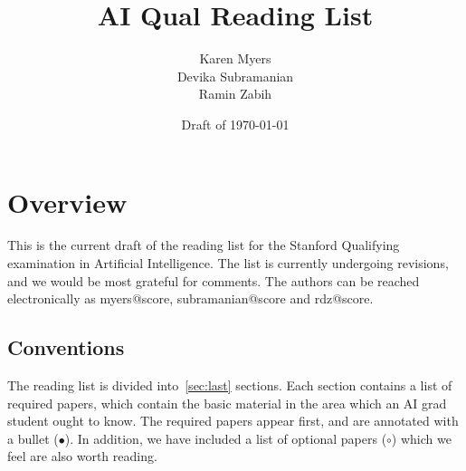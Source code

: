\title{AI Qual Reading List} 
\author{Karen Myers\\
        Devika Subramanian\\
        Ramin Zabih} %

\date{Draft of \today}



\maketitle


\section*{Overview}

This is the current draft of the reading list for the Stanford
Qualifying examination in Artificial Intelligence.  The list is
currently undergoing revisions, and we would be most grateful for
comments.  The authors can be reached electronically as {\sc
myers@score}, {\sc subramanian@score} and {\sc rdz@score}.

\subsection*{Conventions}

The reading list is divided into~\ref{sec:last} sections.  Each
section contains a list of required papers, which contain the basic
material in the area which an AI grad student ought to know.  The
required papers appear first, and are annotated with a bullet
($\bullet$).  In addition, we have included a list of optional papers
($\circ$) which we feel are also worth reading.

